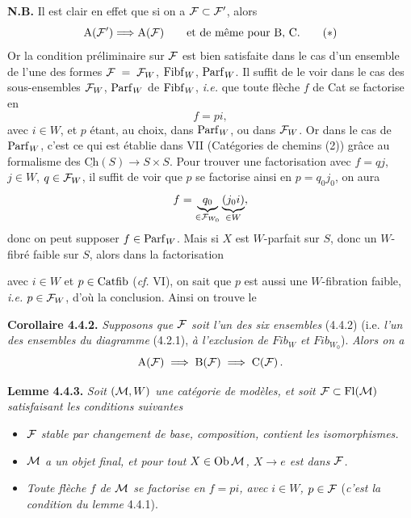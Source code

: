 \textbf{N.B.} Il est clair en effet que si on a $\mathcal{F} \subset \mathcal{F}'$, alors
\[
\mathrm{A}(\cF') \Longrightarrow \mathrm{A}(\cF) \qquad \text{et de même pour B, C.}
\tag*{$(*)$}
\]
Or la condition préliminaire sur $\mathcal{F}$ est bien satisfaite dans le cas d'un ensemble de l'une des formes $\mathcal{F} \;=\; \mathcal{F}_W$, $\mathrm{Fibf}_W$, $\mathrm{Parf}_W$. Il suffit de le voir dans le cas des sous-ensembles $\mathcal{F}_W$, $\mathrm{Parf}_W$ de $\mathrm{Fibf}_W$, \textit{i.e.} que toute flèche $f$ de Cat se factorise en
\[
f = pi,
\]
avec $i \in W$, et $p$ étant, au choix, dans $\mathrm{Parf}_W$, ou dans $\mathcal{F}_W$. Or dans le cas de $\mathrm{Parf}_W$, \marginpar{$\|$}c'est ce qui est établie dans VII (Catégories de chemins (2)) grâce au formalisme des $\underline{\mathrm{Ch}}(S) \longrightarrow S \times S$. Pour trouver une factorisation avec $f = qj$, $j \in W$, $q \in \mathcal{F}_W$, il suffit de voir que $p$ se factorise ainsi en $p = q_0 j_0$, on aura %
\[
f = \underbrace{q_0}_{\in \mathcal{F}_{W_0}} \underbrace{(j_0 i)}_{\in W},
\]
donc on peut supposer $f \in \mathrm{Parf}_W$. Mais si $X$ est $W$-parfait sur $S$, donc un
$W$-fibré faible sur $S$, alors dans la factorisation
\begin{center}
\end{center}
avec $i \in W$ et $p \in \mathrm{Catfib}$ (\textit{cf.} VI), on sait que $p$ est aussi une $W$-fibration faible, \textit{i.e.} $p \in \mathcal{F}_W$, d'où la conclusion. Ainsi on trouve le

\textbf{Corollaire 4.4.2.} \textit{Supposons que $\mathcal{F}$ soit l'un des six ensembles} (4.4.2) (i.e. \textit{l'un des ensembles du diagramme} (4.2.1), \textit{à l'exclusion de $\mathit{Fib}_W$ et $\mathit{Fib}_{W_0}$}). \textit{Alors on a}
\[
\mathrm{A}(\mathcal{F}) \;\Longrightarrow\; \mathrm{B}(\mathcal{F}) \;\Longrightarrow\; \mathrm{C}(\mathcal{F})\,.
\]

\textbf{Lemme 4.4.3.} \textit{Soit $(\mathcal{M}, W)$ une catégorie de modèles, et soit $\mathcal{F} \subset \operatorname{Fl}(\mathcal{M})$ satisfaisant les conditions suivantes}
\begin{itemize}[leftmargin=3em]
\item[1)] \textit{$\mathcal{F}$ stable par changement de base, composition, contient les isomorphismes.}
\item[2)] \textit{$\mathcal{M}$ a un objet final, et pour tout $X \in \mathrm{Ob}\,\mathcal{M}$, $X \longrightarrow e$ est dans $\mathcal{F}$.}
\item[3)] \textit{Toute flèche $f$ de $\mathcal{M}$ se factorise en $f = pi$, avec $i \in W$, $p \in \mathcal{F}$} (\textit{c'est la condition du lemme} 4.4.1).
\end{itemize}

